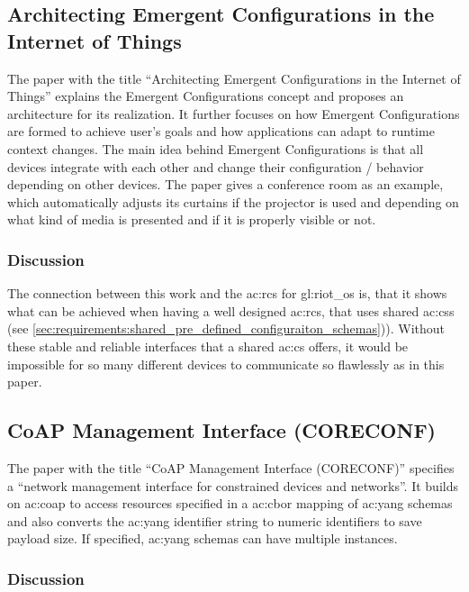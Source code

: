 \subsection{Architecting Emergent Configurations in the Internet of Things}

The paper with the title ``Architecting Emergent Configurations in the Internet of Things''\cite{7930220} explains the Emergent Configurations concept and proposes an architecture for its realization.
It further focuses on how Emergent Configurations are formed to achieve user's goals and how applications can adapt to runtime context changes.
The main idea behind Emergent Configurations is that all devices integrate with each other and change their configuration / behavior depending on other devices.
The paper gives a conference room as an example, which automatically adjusts its curtains if the projector is used and depending on what kind of media is presented and if it is properly visible or not.

\subsubsection{Discussion}

The connection between this work and the \gls{ac:rcs} for \gls{gl:riot_os} is, that it shows what can be achieved when having a well designed \gls{ac:rcs}, that uses shared \glspl{ac:cs} (see \autoref{sec:requirements:shared_pre_defined_configuraiton_schemas})).
Without these stable and reliable interfaces that a shared \gls{ac:cs} offers, it would be impossible for so many different devices to communicate so flawlessly as in this paper.

\subsection{CoAP Management Interface (CORECONF)}

The paper with the title ``CoAP Management Interface (CORECONF)'' \cite{draft-ietf-core-comi-11} specifies a ``network management interface for constrained devices and networks''.
It builds on \gls{ac:coap} to access resources specified in a \gls{ac:cbor} mapping of \acrshort{ac:yang} schemas \cite{RFC-6020} and also converts the \acrshort{ac:yang} identifier string to numeric identifiers to save payload size.
If specified, \acrshort{ac:yang} schemas can have multiple instances.

\subsubsection{Discussion}

